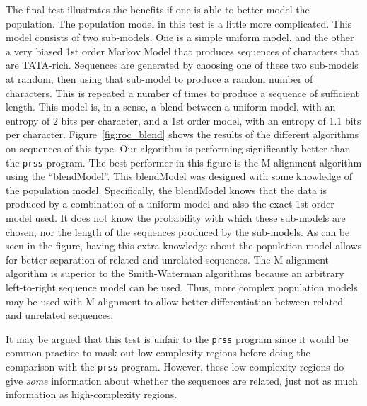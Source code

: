 \documentclass[letterpaper,11pt,oneside]{article}
\begin{document}
\begin{multicols}{2}
The final test illustrates the benefits if one is able to better model the
population.  The population model in this test is a little more complicated.
This model consists of two sub-models.  One is a simple uniform model, and the
other a very biased 1st order Markov Model that produces sequences of
characters that are TATA-rich.  Sequences are generated by
choosing one of these two sub-models at random, then using that sub-model to
produce a random number of characters.  This is repeated a number of times to
produce a sequence of sufficient length.  This model is, in a sense, a blend
between a uniform model, with an entropy of 2 bits per character, and a 1st
order model, with an entropy of 1.1 bits per character.
Figure~\ref{fig:roc_blend} shows the results of the different algorithms on
sequences of this type.  Our algorithm is performing significantly better than
the \verb!prss! program.  The best performer in this figure is the M-alignment
algorithm using the ``blendModel''.  This blendModel was designed with some
knowledge of the population model.  Specifically, the blendModel knows that
the data is produced by a combination of a uniform model and also the exact
1st order model used.  It does not know the probability with which these
sub-models are chosen, nor the length of the sequences produced by the
sub-models.  As can be seen in the figure, having this extra knowledge about
the population model allows for better separation of related and unrelated
sequences.  The M-alignment algorithm is superior to the Smith-Waterman
algorithms because an arbitrary left-to-right sequence model can be used.
Thus, more complex population models may be used with M-alignment to allow
better differentiation between related and unrelated sequences.


It may be argued that this test is unfair to the \verb!prss! program since it
would be common practice to mask out low-complexity regions before doing the
comparison with the \verb!prss! program.  However, these low-complexity
regions do give \emph{some} information about whether the sequences are
related, just not as much information as high-complexity regions.




\end{multicols}
\end{document}
